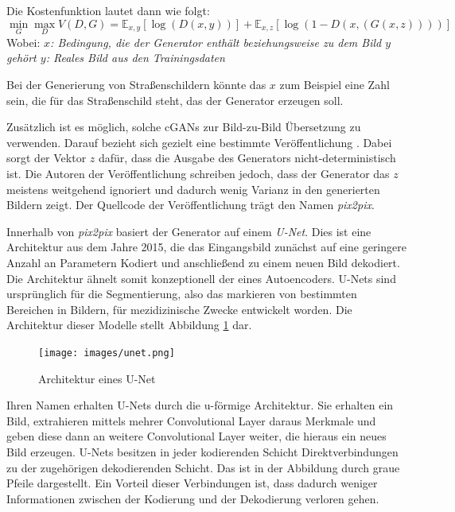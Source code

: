 Die Kostenfunktion lautet dann wie folgt: \cite{pix2pix}
\begin{equation}
   \label{eq:cond_gan}
   \min_{G} \max_{D} V(D,G) = \mathbb{E}_{x, y}[\log(D(x, y))] + \mathbb{E}_{x,z}[\log(1-D(x, (G(x, z))))]
\end{equation}
Wobei: \newline
\emph{\null\quad\quad $x$: Bedingung, die der Generator enthält beziehungsweise zu dem Bild $y$ gehört \newline
\null\quad\quad $y$: Reales Bild aus den Trainingsdaten}

Bei der Generierung von Straßenschildern könnte das $x$ zum Beispiel eine Zahl sein, die für das Straßenschild steht, das der Generator erzeugen soll.

Zusätzlich ist es möglich, solche \acp{cGAN} zur Bild-zu-Bild Übersetzung zu verwenden. Darauf bezieht sich gezielt eine bestimmte Veröffentlichung \cite{pix2pix}. Dabei sorgt der Vektor $z$ dafür, dass die Ausgabe des Generators nicht-deterministisch ist. Die Autoren der Veröffentlichung schreiben jedoch, dass der Generator das $z$ meistens weitgehend ignoriert und dadurch wenig Varianz in den generierten Bildern zeigt. Der Quellcode der Veröffentlichung trägt den Namen \emph{pix2pix}. \cite{pix2pix}

Innerhalb von \emph{pix2pix} basiert der Generator auf einem \emph{U-Net}. Dies ist eine Architektur aus dem Jahre 2015, die das Eingangsbild zunächst auf eine geringere Anzahl an Parametern Kodiert und anschließend zu einem neuen Bild dekodiert. Die Architektur ähnelt somit konzeptionell der eines Autoencoders. U-Nets sind ursprünglich für die Segmentierung, also das markieren von bestimmten Bereichen in Bildern, für mezidizinische Zwecke entwickelt worden. Die Architektur dieser Modelle stellt Abbildung \ref{fig:unet} dar. \cite{unet} \cite{pix2pix}

\begin{figure}[h]
   \centering
   \texttt{[image: images/unet.png]}
   \caption{Architektur eines U-Net \cite{unet}}
   \label{fig:unet}
\end{figure}

Ihren Namen erhalten U-Nets durch die u-förmige Architektur. Sie erhalten ein Bild, extrahieren mittels mehrer Convolutional Layer daraus Merkmale und geben diese dann an weitere Convolutional Layer weiter, die hieraus ein neues Bild erzeugen. U-Nets besitzen in jeder kodierenden Schicht Direktverbindungen zu der zugehörigen dekodierenden Schicht. Das ist in der Abbildung durch graue Pfeile dargestellt. Ein Vorteil dieser Verbindungen ist, dass dadurch weniger Informationen zwischen der Kodierung und der Dekodierung verloren gehen. \cite{unet}

